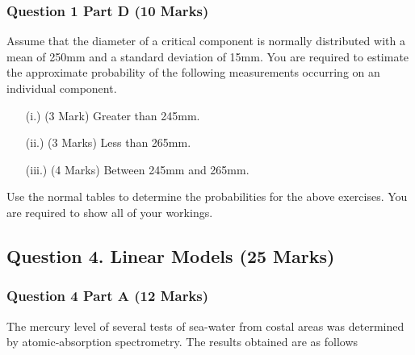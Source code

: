 \documentclass[a4paper,12pt]{article}
\begin{document}
	\bigskip
	\subsubsection*{Question 1 Part D (10 Marks)}
	Assume that the diameter of a critical component is normally distributed with a mean of 250mm and a standard deviation of 15mm. You are required  to estimate the approximate probability of the following measurements occurring on an individual component.
	\begin{itemize}
		\item[(i.)](3 Mark) Greater than 245mm.
		\item[(ii.)](3 Marks) Less than 265mm.
		\item [(iii.)](4 Marks) Between 245mm and 265mm.
	\end{itemize}
	\bigskip
	\noindent Use the normal tables to determine the probabilities for the above exercises. You are required to show all of your workings.
	
	
	\newpage
\subsection*{Question 4. Linear Models (25 Marks)}
\subsubsection*{Question 4 Part A (12 Marks)}
The mercury level of several tests of sea-water from costal areas was determined by atomic-absorption spectrometry. The results obtained are as follows

\end{document}
